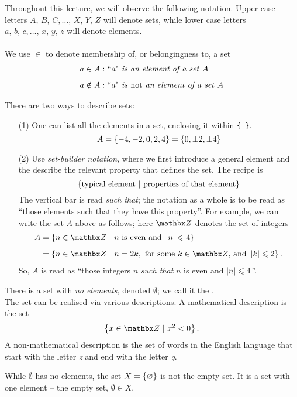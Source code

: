 \vspace*{1em}

\begin{discussion}[Notation]
Throughout this lecture, we will observe the following notation. Upper case letters $A,\,B,\,C,\ldots,\,X,\,Y,\,Z$ will denote sets, while lower case letters $a,\,b,\,c,\ldots,\,x,\,y,\,z$ will denote elements.\\
\\
We use $\in$ to denote membership of, or belongingness to, a set
\begin{align*}
a \in A:& \text{ ``$a$" \emph{is an element of a set} $A$}\\[0.5em]
a \notin A:& \text{ ``$a$" \emph{is \emph{not} an element of a set} $A$}
\end{align*}
\end{discussion}

\vspace*{1em}

\begin{discussion}
There are two ways to describe sets:
\begin{itemize}
\item[(1)] One can list all the elements in a set, enclosing it within \verb!{ }!.
\[A = \left\{-4,-2,0,2,4\right\} = \left\{0,\pm 2,\pm 4\right\}\]
\item[(2)] Use \emph{set-builder notation}, where we first introduce a general element and the describe the relevant property that defines the set. The recipe is
\[\left\{\text{typical element}\ \vert\ \text{properties of that element}\right\}\]
The vertical bar is read \emph{such that}; the notation as a whole is to be read as ``those elements such that they have this property''. For example, we can write the set $A$ above as follows; here $\zz$ denotes the set of integers
\begin{align*}
A &= \setp{n \in \zz}{n \text{ is even and }\abs{n} \leq 4}\\[0.5em]
 &= \setp{n \in \zz}{n = 2k, \text{ for some $k \in \zz$, and }\abs{k} \leq 2}.
\end{align*}
So, $A$ is read as ``those integers $n$ \emph{such that} $n$ is even and $\left\lvert n\right\rvert \leqslant 4$''.
\end{itemize}
\end{discussion}

\vspace*{1em}

\begin{definition}\label{empty-set}
There is a set with \emph{no elements}, denoted $\emptyset$; we call it the .\\[0.5em]
The set can be realised via various descriptions. A mathematical description is the set \[\setp{x \in \zz}{x^2 < 0}.\]
A non-mathematical description is the set of words in the English language that start with the letter \emph{z} and end with the letter \emph{q}.

\begin{dangerbend}
While $\emptyset$ has no elements, the set $X = \left\{\varnothing\right\}$ is not the empty set. It is a set with one element -- the empty set, $\emptyset \in X$.
\end{dangerbend}
\end{definition}

